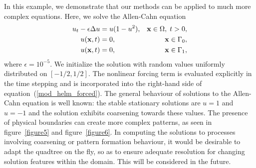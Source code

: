 \documentclass[preprint,12pt]{elsarticle}
\newcommand{\x}{{\bf x}}
\newcommand{\eqr}[1]{~(\ref{#1})}
\newcommand{\figr}[1]{figure~\ref{#1}}
\begin{document}
In this example, we demonstrate that our methods can be applied to much more complex equations. 
Here, we solve the Allen-Cahn equation 
\begin{align*}
   u_t - \epsilon \Delta u & =  u(1-u^2), &   \x \in \Omega, \; t>0, \\
   u(\x,t) & =   0, & \x \in \Gamma_0,  \\
   u(\x,t) & =  0,  &  \x \in \Gamma_1,
\end{align*}
where $\epsilon = 10^{-5}$. 
We initialize the solution with random values uniformly distributed on $[-1/2, 1/2]$.  
The nonlinear forcing term is evaluated explicitly in the time stepping and is incorporated into the right-hand side of equation\eqr{mod_helm_forced}. 
The general behaviour of solutions to the Allen-Cahn equation is well known: 
the stable stationary solutions are $u=1$ and $u=-1$ and the solution exhibits coarsening towards these values.
The presence of physical boundaries can create more complex patterns, as seen in \figr{figure5} and \figr{figure6}. 
In computing the solutions to processes involving coarsening or pattern formation behaviour, it would be desirable to adapt the quadtree on the fly, so as to ensure adequate resolution for changing solution features within the domain. This will be considered in the future.
\end{document}
